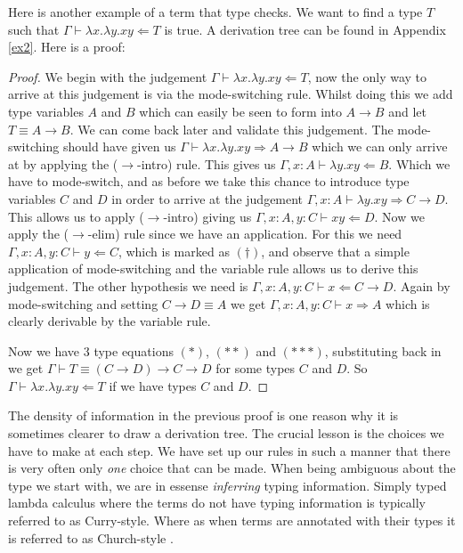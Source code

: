 \begin{example}\label{fun_app}
    Here is another example of a term that type checks. We want to find a type $T$ such that $\Gamma \vdash \lambda x . \lambda y . x y \Leftarrow T$ is true. A derivation tree can be found in Appendix \ref{ex2}. Here is a proof:
        
    \begin{proof}
        We begin with the judgement $\Gamma \vdash \lambda x . \lambda y . x y \Leftarrow T$, now the only way to arrive at this judgement is via the mode-switching rule.
        Whilst doing this we add type variables $A$ and $B$ which can easily be seen to form into $A \to B$ and let $T \equiv A \to B$.
        We can come back later and validate this judgement.
        The mode-switching should have given us $\Gamma \vdash \lambda x . \lambda y . x y \Rightarrow A \to B$ which we can only arrive at by applying the ($\to$-intro) rule. This gives us $\Gamma , x : A \vdash \lambda y . xy \Leftarrow B$.
        Which we have to mode-switch, and as before we take this chance to introduce type variables $C$ and $D$ in order to arrive at the judgement $\Gamma , x : A \vdash \lambda y . x y \Rightarrow C \to D$.
        This allows us to apply ($\to$-intro) giving us $\Gamma , x : A , y : C \vdash xy \Leftarrow D$.
        Now we apply the ($\to$-elim) rule since we have an application.
        For this we need $\Gamma , x : A, y : C \vdash y \Leftarrow C$, which is marked as $(\dagger)$, and observe that a simple application of mode-switching and the variable rule allows us to derive this judgement.
        The other hypothesis we need is $\Gamma , x : A, y : C \vdash x \Leftarrow C \to D$.
        Again by mode-switching and setting $C \to D \equiv A$ we get $\Gamma , x : A, y : C \vdash x \Rightarrow A$ which is clearly derivable by the variable rule.
            
        Now we have 3 type equations $(*)$, $(**)$ and $(***)$, substituting back in we get $\Gamma \vdash T \equiv (C \to D) \to C \to D$ for some types $C$ and $D$. So $\Gamma \vdash \lambda x . \lambda y . x y \Leftarrow T$ if we have types $C$ and $D$.
    \end{proof}
\end{example}

\begin{remark}
    The density of information in the previous proof is one reason why it is sometimes clearer to draw a derivation tree. The crucial lesson is the choices we have to make at each step. We have set up our rules in such a manner that there is very often only \emph{one} choice that can be made. When being ambiguous about the type we start with, we are in essense \emph{inferring} typing information. Simply typed lambda calculus where the terms do not have typing information is typically referred to as Curry-style. Where as when terms are annotated with their types it is referred to as Church-style \cite{Sorensen}.
\end{remark}


